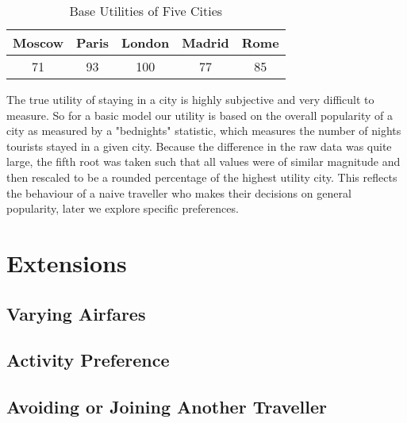 \documentclass[12pt]{article}
\begin{document}
\begin{table}[h]
\caption{Base Utilities of Five Cities}
\centering
\vspace{1mm}
\begin{tabular}{c|c|c|c|c}
\hline
\rule{0pt}{2ex} Moscow & Paris & London & Madrid & Rome \\
\hline
\rule{0pt}{2ex} 71 & 93 & 100 & 77 & 85 \\
\end{tabular}
\end{table}
The true utility of staying in a city is highly subjective and very difficult to measure. So for a basic model our utility is based on the overall popularity of a city as measured by a "bednights" statistic, which measures the number of nights tourists stayed in a given city. Because the difference in the raw data was quite large, the fifth root was taken such that all values were of similar magnitude and then rescaled to be a rounded percentage of the highest utility city. This reflects the behaviour of a naive traveller who makes their decisions on general popularity, later we explore specific preferences.



\pagebreak

\section{Extensions} 
\label{sec:extensions}


\lipsum[3]

\subsection{Varying Airfares}


\subsection{Activity Preference}


\subsection{Avoiding or Joining Another Traveller}
\end{document}
